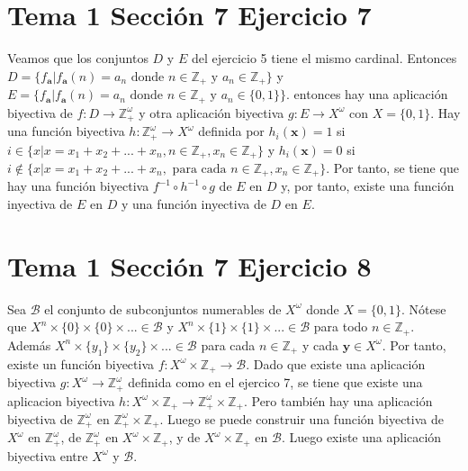 \documentclass{article}
\newcommand{\vect}[1]{\boldsymbol{#1}}
\begin{document}
\section{Tema 1 Sección 7 Ejercicio 7}
Veamos que los conjuntos $D$ y $E$ del ejercicio 5 tiene el mismo cardinal. Entonces $D=\{f_{\vect{a}}|f_{\vect{a}}(n)=a_n\text{ donde }n\in \mathbb{Z}_{+}\text{ y }a_n\in \mathbb{Z}_{+}\}$ y $E=\{f_{\vect{a}}|f_{\vect{a}}(n)=a_n\text{ donde }n\in \mathbb{Z}_{+}\text{ y }a_n\in \{0,1\}\}$. entonces hay una aplicación biyectiva de $f:D\rightarrow \mathbb{Z}^{\omega}_{+}$ y otra aplicación biyectiva $g:E\rightarrow X^{\omega}$ con $X=\{0,1\}$. Hay una función biyectiva $h:\mathbb{Z}^{\omega}_{+}\rightarrow X^{\omega}$ definida por $h_{i}(\vect{x})=1$ si $i\in\{x|x=x_1+x_2+...+x_n,n\in\mathbb{Z}_{+}, x_n\in\mathbb{Z}_{+}\}$ y $h_{i}(\vect{x})=0$ si $i\notin\{x|x=x_1+x_2+...+x_n,\text{ para cada }n\in\mathbb{Z}_{+}, x_n\in\mathbb{Z}_{+}\}$. Por tanto, se tiene que hay una función biyectiva $f^{-1}\circ h^{-1}\circ g$ de $E$ en $D$ y, por tanto, existe una función inyectiva de $E$ en $D$ y una función inyectiva de $D$ en $E$.
\section{Tema 1 Sección 7 Ejercicio 8}
Sea $\mathcal{B}$ el conjunto de subconjuntos numerables de $X^{\omega}$ donde $X=\{0,1\}$. Nótese que $X^n\times \{0\}\times \{0\}\times ...\in \mathcal{B}$ y $X^n\times \{1\}\times \{1\}\times ...\in \mathcal{B}$ para todo $n\in \mathbb{Z}_{+}$. Además $X^n\times \{y_1\}\times \{y_2\}\times ...\in \mathcal{B}$ para cada $n\in \mathbb{Z}_{+}$ y cada $\vect{y}\in X^\omega$. Por tanto, existe un función biyectiva $f:X^{\omega}\times \mathbb{Z}_{+}\rightarrow \mathcal{B}$. Dado que existe una aplicación biyectiva $g:X^{\omega}\rightarrow \mathbb{Z}^{\omega}_{+}$ definida como en el ejercico 7, se tiene que existe una aplicacion biyectiva $h:X^{\omega}\times \mathbb{Z}_{+}\rightarrow \mathbb{Z}^{\omega}_{+}\times \mathbb{Z}_{+}$. Pero también hay una aplicación biyectiva de $\mathbb{Z}^{\omega}_{+}$ en $\mathbb{Z}^{\omega}_{+}\times \mathbb{Z}_{+}$. Luego se puede construir una función biyectiva de $X^{\omega}$ en $\mathbb{Z}^{\omega}_{+}$, de $\mathbb{Z}^{\omega}_{+}$ en  $X^{\omega} \times \mathbb{Z}_{+}$, y de $X^{\omega} \times \mathbb{Z}_{+}$ en $\mathcal{B}$. Luego existe una aplicación biyectiva entre $X^{\omega}$ y $\mathcal{B}$.
\end{document}
